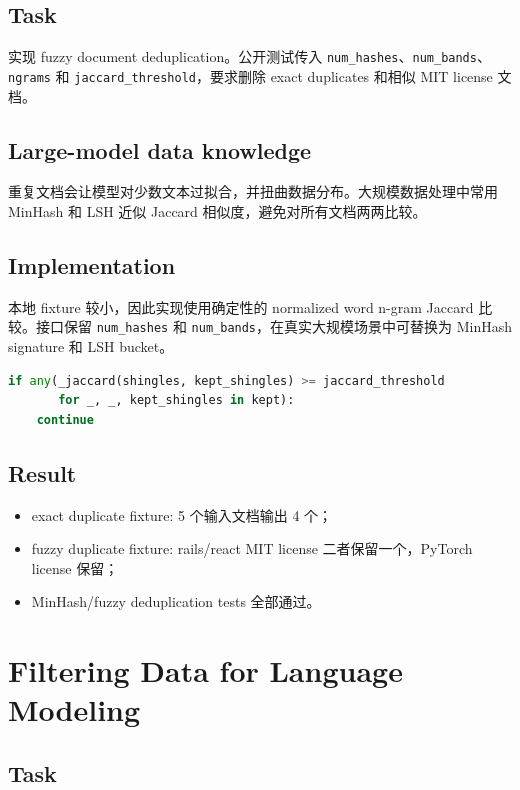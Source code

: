 \documentclass[UTF8,11pt]{ctexart}
\begin{document}
\subsection*{Task}

实现 fuzzy document deduplication。公开测试传入 \texttt{num\_hashes}、\texttt{num\_bands}、
\texttt{ngrams} 和 \texttt{jaccard\_threshold}，要求删除 exact duplicates 和相似 MIT license 文档。

\subsection*{Large-model data knowledge}

重复文档会让模型对少数文本过拟合，并扭曲数据分布。大规模数据处理中常用 MinHash 和 LSH 近似 Jaccard
相似度，避免对所有文档两两比较。

\subsection*{Implementation}

本地 fixture 较小，因此实现使用确定性的 normalized word n-gram Jaccard 比较。接口保留
\texttt{num\_hashes} 和 \texttt{num\_bands}，在真实大规模场景中可替换为 MinHash signature 和 LSH bucket。

\begin{lstlisting}[language=Python]
if any(_jaccard(shingles, kept_shingles) >= jaccard_threshold
       for _, _, kept_shingles in kept):
    continue
\end{lstlisting}

\subsection*{Result}

\begin{itemize}
  \item exact duplicate fixture: 5 个输入文档输出 4 个；
  \item fuzzy duplicate fixture: rails/react MIT license 二者保留一个，PyTorch license 保留；
  \item MinHash/fuzzy deduplication tests 全部通过。
\end{itemize}

\section{Filtering Data for Language Modeling}

\subsection*{Task}
\end{document}
